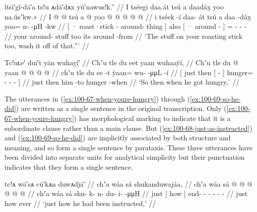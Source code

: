 \ex\label{ex:100-66-wash-off}%
%
\begingl
	\glpreamble	îtsī′gî-dā′a ts!u ᴀdā′dᴀx yū′nawus!k.” //
	\glpreamble	I tséegi daa.át tsú a daadáx̱ yoo na.úsʼkw.\!» //
	\gla	{} I  @ {}  @ {} {} tsú 
		{} a  @ {} {}
		yoo @  @ {} @ {} @ {} @ {} //
	\glb	{} i tséek -í daa- át {} tsú
		{} a daa -dáx̱ {}
		yoo= n- {}  -μH -kw //
	\glc	{}[ · roast·stick - around- thing {}] also
		{}[ · around - {}]
		= - \·  - - //
	\gld	{} your  {} around- stuff {} too
		{} its around -from {} 
		  {} {} {} {} //
	\glft	‘The stuff on your roasting stick too, wash it off of that.”’
		//
\endgl
\xe

\ex\label{ex:100-67-when-youre-hungry}%
%
\begingl
	\glpreamble	Tc!uʟe′ duī′t yān wuhaỵî′ //
	\glpreamble	Chʼu tle du eet yaan wuhaaÿí, //
	\gla	{} Chʼu tle
		{} du  @ {} {} 
		yaan @  @ {} @ {} @ {} {} //
	\glb	{} chʼu tle
		{} du ee -t {} 
		ÿaan= wu-  -μμL -í {} //
	\glc	{}[ just then
		{}[   - {}]
		hunger= -  - - {}] //
	\gld	{} just then
		{} him {} -to {} 
		hunger  {} {} {} {} -when {} //
	\glft	‘So then when he got hungry,’
 		//
\endgl
\xe

The utterances in (\ref{ex:100-67-when-youre-hungry}) through (\ref{ex:100-69-so-he-did}) are written as a single sentence in the original transcription.
Only (\ref{ex:100-67-when-youre-hungry}) has morphological marking to indicate that it is a subordinate clause rather than a main clause.
But (\ref{ex:100-68-just-as-instructed}) and (\ref{ex:100-69-so-he-did}) are implicitly associated by both structure and meaning, and so form a single sentence by parataxis.
These three utterances have been divided into separate units for analytical simplicity but their punctuation indicates that they form a single sentence.

\ex\label{ex:100-68-just-as-instructed}%
%
\begingl
	\glpreamble	tc!ᴀ wā′sᴀ cū′kᴀn duwᴀdjā′ //
	\glpreamble	chʼa wáa sá shukanduwajáa, //
	\gla	chʼa {} wáa sá {}  @ {} @ {} @ {} @ {} @ {} @ {} //
	\glb	chʼa {} wáa sá {} shu- k- n- du- i-  -μμH //
	\glc	just {}[ how  {}] end- - - - -  - //
	\gld	just {} how ever {}  {} {} {} {} {} //
	\glft	‘just how he had been instructed,’
		//
\endgl
\xe

